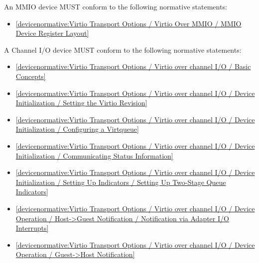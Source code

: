 \label{sec:Conformance / Device Conformance / MMIO Device Conformance}

An MMIO device MUST conform to the following normative statements:

\begin{itemize}
\item \ref{devicenormative:Virtio Transport Options / Virtio Over MMIO / MMIO Device Register Layout}
\end{itemize}

\label{sec:Conformance / Device Conformance / Channel I/O Device Conformance}

A Channel I/O device MUST conform to the following normative statements:

\begin{itemize}
\item \ref{devicenormative:Virtio Transport Options / Virtio over channel I/O / Basic Concepts}
\item \ref{devicenormative:Virtio Transport Options / Virtio over channel I/O / Device Initialization / Setting the Virtio Revision}
\item \ref{devicenormative:Virtio Transport Options / Virtio over channel I/O / Device Initialization / Configuring a Virtqueue}
\item \ref{devicenormative:Virtio Transport Options / Virtio over channel I/O / Device Initialization / Communicating Status Information}
\item \ref{devicenormative:Virtio Transport Options / Virtio over channel I/O / Device Initialization / Setting Up Indicators / Setting Up Two-Stage Queue Indicators}
\item \ref{devicenormative:Virtio Transport Options / Virtio over channel I/O / Device Operation / Host->Guest Notification / Notification via Adapter I/O Interrupts}
\item \ref{devicenormative:Virtio Transport Options / Virtio over channel I/O / Device Operation / Guest->Host Notification}
\end{itemize}

\label{sec:Conformance / Device Conformance / Network Device Conformance}

